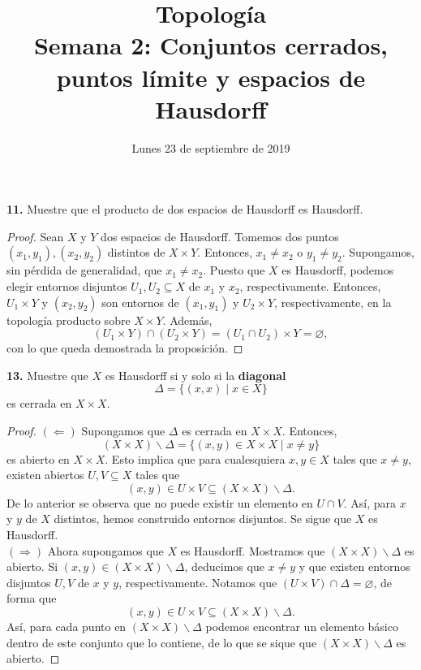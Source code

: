 \documentclass{article}
\begin{document}
\date{Lunes 23 de septiembre de 2019}
\title{ \textbf{Topología} \\
Semana 2: Conjuntos cerrados, puntos límite y espacios de Hausdorff}
\maketitle	

\begin{mybox}
\textbf{11. } Muestre que el producto de dos espacios de Hausdorff es Hausdorff. 	
\end{mybox}	
\begin{proof}
	Sean $X$ y $Y$ dos espacios de Hausdorff. Tomemos dos puntos $(x_{1}, y_{1}), (x_{2}, y_{2})$ distintos de $X \times Y$. Entonces, $x_{1} \neq x_{2}$ o $y_{1} \neq y_{2}$. Supongamos, sin pérdida de generalidad, que $x_{1} \neq x_{2}$. Puesto que $X$ es Hausdorff, podemos elegir entornos disjuntos $U_{1}, U_{2} \subseteq X$ de $x_{1}$ y $x_{2}$, respectivamente.  Entonces, $U_{1} \times Y$ y $(x_{2}, y_{2})$ son entornos de $(x_{1}, y_{1})$ y $U_{2} \times Y$, respectivamente, en la topología producto sobre $X \times Y$. Además, 
	$$ \left( U_{1} \times Y \right) \cap \left( U_{2} \times Y \right) =   \left( U_{1} \cap U_{2} \right) \times Y = \varnothing, $$
	con lo que queda demostrada la proposición. 
\end{proof}

\begin{mybox}
	\textbf{13. } Muestre que $X$ es Hausdorff si y solo si la \textbf{diagonal}
	$$ \Delta = \{ (x, x) \mid x \in X \} $$
	es cerrada en $ X \times X$.
\end{mybox}	
\begin{proof}
	$(\Leftarrow)$ Supongamos que $\Delta$ es cerrada en $X \times X$. Entonces, 
	$$ \left( X \times X \right)  \backslash \Delta = \{ (x, y) \in X \times X \mid x \neq y \}$$ 
es abierto en $X \times X$. Esto implica que para cualesquiera $x, y \in X$ tales que $x \neq y$, existen abiertos $U, V \subseteq X$ tales que
$$ (x, y) \in U \times V \subseteq  \left( X \times X \right)  \backslash \Delta. $$
De lo anterior se observa que no puede existir un elemento en $U \cap V$. Así, para $x$ y $y$ de $X$ distintos, hemos construido entornos disjuntos. Se sigue que $X$ es Hausdorff.\\
$(\Rightarrow)$ Ahora supongamos que $X$ es Hausdorff. Mostramos que $\left( X \times X \right)  \backslash \Delta$ es abierto. Si $(x, y) \in \left( X \times X \right)  \backslash \Delta$, deducimos que $x \neq y$ y que existen entornos disjuntos $U, V$ de $x$ y $y$, respectivamente. Notamos que $ (U \times V) \cap \Delta = \varnothing$, de forma que 
$$(x, y) \in U \times V \subseteq \left( X \times X \right)  \backslash \Delta.$$ 
Así, para cada punto en $\left( X \times X \right)  \backslash \Delta$ podemos encontrar un elemento básico dentro de este conjunto que lo contiene, de lo que se sique que $\left( X \times X \right)  \backslash \Delta$ es abierto. 
\end{proof}
\end{document}
